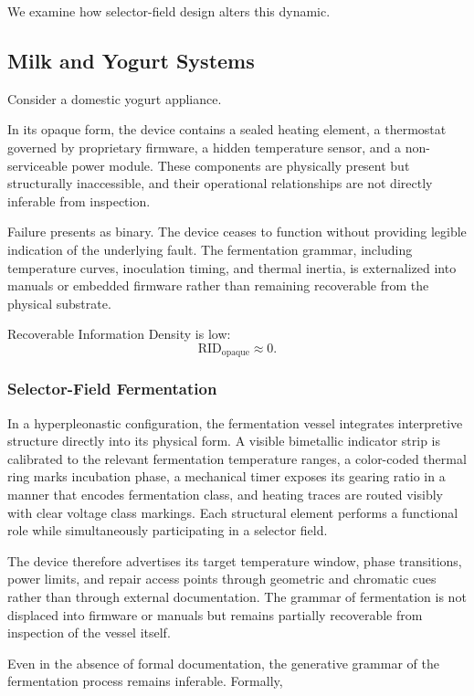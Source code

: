 \documentclass[11pt]{article}
\begin{document}
We examine how selector-field design alters this dynamic.

\subsection{Milk and Yogurt Systems}

Consider a domestic yogurt appliance.

In its opaque form, the device contains a sealed heating element,
a thermostat governed by proprietary firmware, a hidden temperature
sensor, and a non-serviceable power module. These components are
physically present but structurally inaccessible, and their operational
relationships are not directly inferable from inspection.

Failure presents as binary. The device ceases to function without
providing legible indication of the underlying fault. The fermentation
grammar, including temperature curves, inoculation timing, and thermal
inertia, is externalized into manuals or embedded firmware rather than
remaining recoverable from the physical substrate.

Recoverable Information Density is low:
\[
\text{RID}_{\text{opaque}} \approx 0.
\]

\subsubsection{Selector-Field Fermentation}

In a hyperpleonastic configuration, the fermentation vessel integrates
interpretive structure directly into its physical form. A visible
bimetallic indicator strip is calibrated to the relevant fermentation
temperature ranges, a color-coded thermal ring marks incubation phase,
a mechanical timer exposes its gearing ratio in a manner that encodes
fermentation class, and heating traces are routed visibly with clear
voltage class markings. Each structural element performs a functional
role while simultaneously participating in a selector field.

The device therefore advertises its target temperature window, phase
transitions, power limits, and repair access points through geometric
and chromatic cues rather than through external documentation. The
grammar of fermentation is not displaced into firmware or manuals but
remains partially recoverable from inspection of the vessel itself.

Even in the absence of formal documentation, the generative grammar of
the fermentation process remains inferable. Formally,
\end{document}
